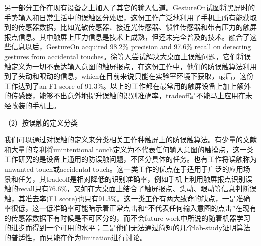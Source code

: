 另一部分工作在现有设备之上加入了其它的输入信道\cite{2015-GestureOn,2020-TabletopTouch,2001-PalmPressure,2019-BeyondUnint}。GestureOn\cite{2015-GestureOn}试图将黑屏时的手势输入和日常生活中的误触区分处理，这份工作广泛地利用了手机上所有能获取到的传感器数据，比如光敏传感器、接近光传感器、惯性传感器和带有压力的触屏报点信息。其中触屏上压力信息是技术上成熟，但还未完全普及的技术。融合了这些信息以后，GestureOn acquired 98.2\% precision and 97.6\% recall on detecting gestures from accidental touches。徐等人尝试解决大桌面上误触问题\cite{2020-TabletopTouch}，它们将误触定义为一切不表达输入意图的触屏报点，在这份工作中，他们的防误触算法利用到了头动和眼动的信息，which在目前来说只能在实验室环境下获取，最后，这份工作达到了an F1 score of 91.3\%。以上的工作都在最常用的触屏设备上加上额外的传感器，能够不出意外地提升误触的识别准确率，tradeoff是不能马上应用在未经改装的手机上。


（2）按误触的定义分类

我们可以通过对误触的定义来分类相关工作种触屏上的防误触算法。有少量的文献\cite{2012-IdentifyUnint,2020-TabletopTouch}和大量的专利\cite{2016-Classification,2006-PadUnint,2013-System,2013-Precluding,2015-TouchScreen}将unintentional touch定义为不代表任何输入意图的触摸点\cite{2020-TabletopTouch}，这一类工作研究的是设备上通用的防误触问题，不区分具体的任务。也有工作将误触称为unwanted touch或accidental touch\cite{2015-GestureOn,2012-IdentifyUnint}。这一类工作的优点在于适用于广泛的应用场景和任务，其tradeoff是相对降低的识别准确率，例如手机上利用触屏报点识别误触的recall只有76.6\%\cite{2012-IdentifyUnint}，又如在大桌面上结合了触屏报点、头动、眼动等信息判断误触，其准去率(F1 score)也只有91.3\%。这一类工作有两大致命的缺点，一是准确率很低，这一低准确率可能暗示着正常点击和“不代表任何输入意图的点击”在现有的传感器数据下有时候是不可区分的，而不会future-work中所说的随着机器学习的进步而得到一个可用的水平；二是他们无法通过简短的几个lab-study证明算法的普适性，而只能在作为limitation进行讨论。

